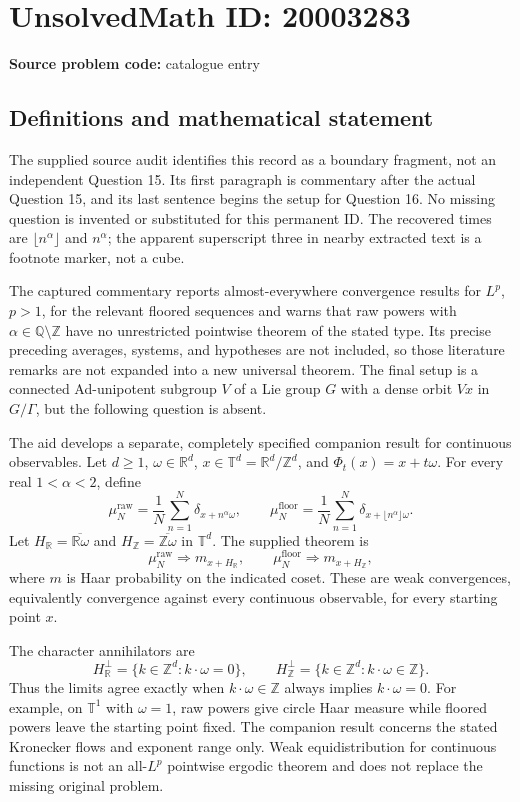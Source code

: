 \documentclass[11pt]{article}
\newcommand{\Z}{\mathbb{Z}}
\newcommand{\Q}{\mathbb{Q}}
\newcommand{\R}{\mathbb{R}}
\begin{document}
\section*{UnsolvedMath ID: 20003283}
\textbf{Source problem code:} catalogue entry
\subsection{Definitions and mathematical statement}
The supplied source audit identifies this record as a boundary fragment, not an independent Question 15. Its first paragraph is commentary after the actual Question 15, and its last sentence begins the setup for Question 16. No missing question is invented or substituted for this permanent ID. The recovered times are $\lfloor n^\alpha\rfloor$ and $n^\alpha$; the apparent superscript three in nearby extracted text is a footnote marker, not a cube.

The captured commentary reports almost-everywhere convergence results for $L^p$, $p>1$, for the relevant floored sequences and warns that raw powers with $\alpha\in\Q\setminus\Z$ have no unrestricted pointwise theorem of the stated type. Its precise preceding averages, systems, and hypotheses are not included, so those literature remarks are not expanded into a new universal theorem. The final setup is a connected Ad-unipotent subgroup $V$ of a Lie group $G$ with a dense orbit $Vx$ in $G/\Gamma$, but the following question is absent.

The aid develops a separate, completely specified companion result for continuous observables. Let $d\geq1$, $\omega\in\R^d$, $x\in\mathbb T^d=\R^d/\Z^d$, and $\Phi_t(x)=x+t\omega$. For every real $1<\alpha<2$, define
\[
\mu_N^{\mathrm{raw}}=\frac1N\sum_{n=1}^N\delta_{x+n^\alpha\omega},\qquad
\mu_N^{\mathrm{floor}}=\frac1N\sum_{n=1}^N\delta_{x+\lfloor n^\alpha\rfloor\omega}.
\]
Let $H_{\R}=\overline{\R\omega}$ and $H_{\Z}=\overline{\Z\omega}$ in $\mathbb T^d$. The supplied theorem is
\[
\mu_N^{\mathrm{raw}}\Longrightarrow m_{x+H_{\R}},\qquad
\mu_N^{\mathrm{floor}}\Longrightarrow m_{x+H_{\Z}},
\]
where $m$ is Haar probability on the indicated coset. These are weak convergences, equivalently convergence against every continuous observable, for every starting point $x$.

The character annihilators are
\[
H_{\R}^{\perp}=\{k\in\Z^d:k\cdot\omega=0\},\qquad
H_{\Z}^{\perp}=\{k\in\Z^d:k\cdot\omega\in\Z\}.
\]
Thus the limits agree exactly when $k\cdot\omega\in\Z$ always implies $k\cdot\omega=0$. For example, on $\mathbb T^1$ with $\omega=1$, raw powers give circle Haar measure while floored powers leave the starting point fixed. The companion result concerns the stated Kronecker flows and exponent range only. Weak equidistribution for continuous functions is not an all-$L^p$ pointwise ergodic theorem and does not replace the missing original problem.
\end{document}
